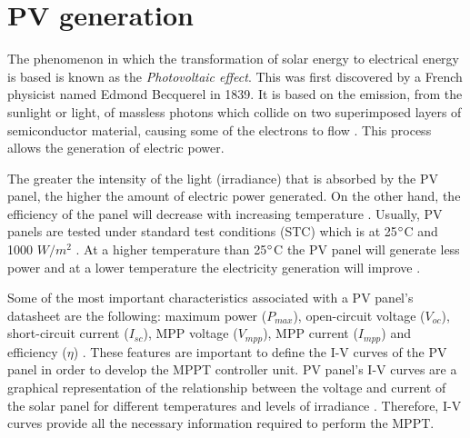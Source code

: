 \section{PV generation}

The phenomenon in which the transformation of solar energy to electrical energy is based is known as the \textit{Photovoltaic effect}. This  was first discovered by a French physicist named Edmond Becquerel in 1839. It is based on the emission, from the sunlight or light, of massless photons which collide on two superimposed layers of semiconductor material, causing some of the electrons to flow \cite{PVeffect}. This process allows the generation of electric power. 


The greater the intensity of the light (irradiance) that is absorbed by the PV panel, the higher the amount of electric power generated. On the other hand, the efficiency of the panel will decrease with increasing temperature \cite{handbook}. Usually, PV panels are tested under standard test conditions (STC) which is at 25$\dec$C and 1000 $W/ m^2$ \cite{handbook}. At a higher temperature than 25$\dec$C the PV panel will generate less power and at a lower temperature the electricity generation will improve \cite{handbook}.  %

Some of the most important characteristics associated with a PV panel’s datasheet are the following: maximum power ($P_{max}$), open-circuit voltage ($V_{oc}$), short-circuit current ($I_{sc}$), MPP voltage ($V_{mpp}$), MPP current ($I_{mpp}$) and efficiency ($\eta$) \cite{handbook}.  %
These features are important to define the I-V curves of the PV panel in order to develop the MPPT controller unit. PV panel's I-V curves are a graphical representation of the relationship between the voltage and current of the solar panel for different temperatures and levels of irradiance \cite{IVcurves}. Therefore, I-V curves provide all the necessary information required to perform the MPPT. %

